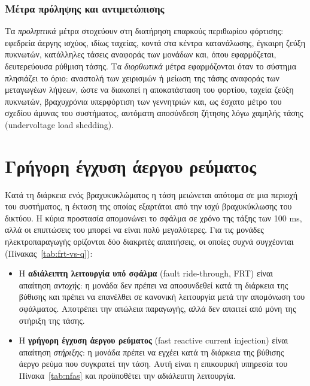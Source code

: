 \subsubsection{Μέτρα πρόληψης και αντιμετώπισης}

Τα \emph{προληπτικά} μέτρα στοχεύουν στη διατήρηση επαρκούς περιθωρίου φόρτισης: εφεδρεία
άεργης ισχύος, ιδίως ταχείας, κοντά στα κέντρα κατανάλωσης, έγκαιρη ζεύξη πυκνωτών, κατάλληλες
τάσεις αναφοράς των μονάδων και, όπου εφαρμόζεται, δευτερεύουσα ρύθμιση τάσης. Τα
\emph{διορθωτικά} μέτρα εφαρμόζονται όταν το σύστημα πλησιάζει το όριο: αναστολή των χειρισμών
ή μείωση της τάσης αναφοράς των μεταγωγέων λήψεων, ώστε να διακοπεί η αποκατάσταση του
φορτίου, ταχεία ζεύξη πυκνωτών, βραχυχρόνια υπερφόρτιση των γεννητριών και, ως έσχατο μέτρο του
σχεδίου άμυνας του συστήματος, αυτόματη αποσύνδεση ζήτησης λόγω χαμηλής τάσης (undervoltage
load shedding).

\section{Γρήγορη έγχυση άεργου ρεύματος}
\label{sec:frt}

Κατά τη διάρκεια ενός βραχυκυκλώματος η τάση μειώνεται απότομα σε μια περιοχή του συστήματος,
η έκταση της οποίας εξαρτάται από την ισχύ βραχυκύκλωσης του δικτύου. Η κύρια προστασία
απομονώνει το σφάλμα σε χρόνο της τάξης των 100 ms, αλλά οι επιπτώσεις του μπορεί να είναι
πολύ μεγαλύτερες. Για τις μονάδες ηλεκτροπαραγωγής ορίζονται δύο διακριτές απαιτήσεις, οι
οποίες συχνά συγχέονται (Πίνακας~\ref{tab:frt-vs-q}):

\begin{itemize}
\item Η \textbf{αδιάλειπτη λειτουργία υπό σφάλμα} (fault ride-through, FRT) είναι
      απαίτηση \emph{αντοχής}: η μονάδα δεν πρέπει να αποσυνδεθεί κατά τη διάρκεια της
      βύθισης και πρέπει να επανέλθει σε κανονική λειτουργία μετά την απομόνωση του σφάλματος.
      Αποτρέπει την απώλεια παραγωγής, αλλά δεν απαιτεί από μόνη της στήριξη της τάσης.
\item Η \textbf{γρήγορη έγχυση άεργου ρεύματος} (fast reactive current injection) είναι
      απαίτηση \emph{στήριξης}: η μονάδα πρέπει να εγχέει κατά τη διάρκεια της βύθισης άεργο
      ρεύμα που συγκρατεί την τάση. Αυτή είναι η επικουρική υπηρεσία του
      Πίνακα~\ref{tab:nfas} και προϋποθέτει την αδιάλειπτη λειτουργία.
\end{itemize}

